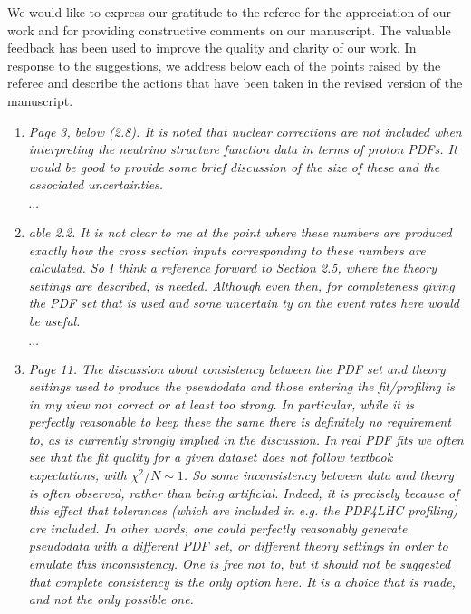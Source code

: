\documentclass[11pt,a4paper]{article}
\begin{document}
	
\noindent
We would like to express our gratitude to the referee for the appreciation
of our work and for providing constructive
comments on our manuscript. The valuable feedback has been used to
improve the quality and clarity of our work.
%
In response to the suggestions, we address below each of the points raised by 
the referee and describe the actions that have been taken
in the revised version of the manuscript.

\noindent

\begin{enumerate}
	\item {\it Page 3, below (2.8). It is noted that nuclear corrections are not included when 
		interpreting the neutrino structure function data in terms of proton PDFs. It would be good
		to provide some brief discussion of the size of these and the associated uncertainties.
	}
	
	$\cdots$
	
	\item {\it able 2.2. It is not clear to me at the point where these numbers are produced exactly
		how the cross section inputs corresponding to these numbers are calculated. So I
		think a reference forward to Section 2.5, where the theory settings are described, is
		needed. Although even then, for completeness giving the PDF set that is used and
		some uncertain
		ty on the event rates here would be useful.
	}
	
	$\cdots$
	
	\item {\it Page 11. The discussion about consistency between the PDF set and theory settings
		used to produce the pseudodata and those entering the fit/profiling is in my view not
		correct or at least too strong. In particular, while it is perfectly reasonable to keep
		these the same there is definitely no requirement to, as is currently strongly implied in
		the discussion. In real PDF fits we often see that the fit quality for a given dataset does
		not follow textbook expectations, with $\chi^2/N \sim 1$. So some inconsistency between data
		and theory is often observed, rather than being artificial. Indeed, it is precisely because
		of this effect that tolerances (which are included in e.g. the PDF4LHC profiling) are
		included. In other words, one could perfectly reasonably generate pseudodata with a
		different PDF set, or different theory settings in order to emulate this inconsistency.
		One is free not to, but it should not be suggested that complete consistency is the only
		option here. It is a choice that is made, and not the only possible one.
	}
	

\end{enumerate}
\end{document}
